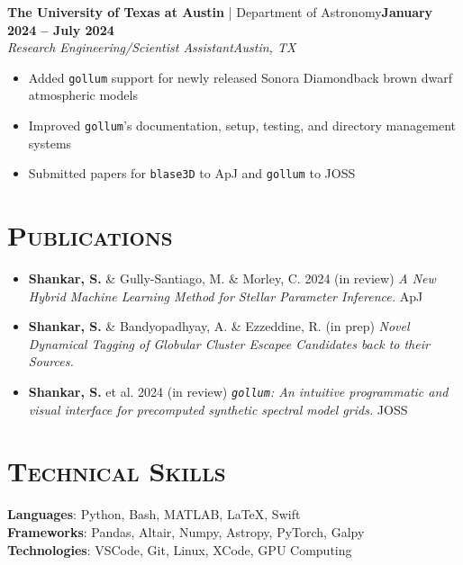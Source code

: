 \documentclass[11pt]{article}
\begin{document}
\normalsize\textbf{The University of Texas at Austin} | Department of Astronomy\hfill\small\textbf{January 2024 -- July 2024}
\\ \textit{Research Engineering/Scientist Assistant\hfill Austin, TX} \vspace{-15pt}
\\ \begin{itemize}[itemsep=-3pt, parsep=3pt, label={--}]
    \item Added \texttt{gollum} support for newly released Sonora Diamondback brown dwarf atmospheric models
    \item Improved \texttt{gollum}'s documentation, setup, testing, and directory management systems
    \item Submitted papers for \texttt{blase3D} to ApJ and \texttt{gollum} to JOSS
\end{itemize}

\section{\textsc{Publications}}
\begin{itemize}[itemsep=-3pt, parsep=3pt, label={--}]
    \item \textbf{Shankar, S.} \& Gully-Santiago, M. \& Morley, C. 2024 (in review)
    \textit{A New Hybrid Machine Learning Method for Stellar Parameter Inference.} ApJ
    \item \textbf{Shankar, S.} \& Bandyopadhyay, A. \& Ezzeddine, R. (in prep)
    \textit{Novel Dynamical Tagging of Globular Cluster Escapee Candidates back to their Sources.}
    \item \textbf{Shankar, S.} et al. 2024 (in review)
    \textit{\texttt{gollum}: An intuitive programmatic and visual interface for precomputed synthetic spectral model grids.} JOSS
\end{itemize}

\section{\textsc{Technical Skills}}
\textbf{Languages}: Python, Bash, MATLAB, \LaTeX, Swift
\\\textbf{Frameworks}: Pandas, Altair, Numpy, Astropy, PyTorch, Galpy
\\\textbf{Technologies}: VSCode, Git, Linux, XCode, GPU Computing
\end{document}
